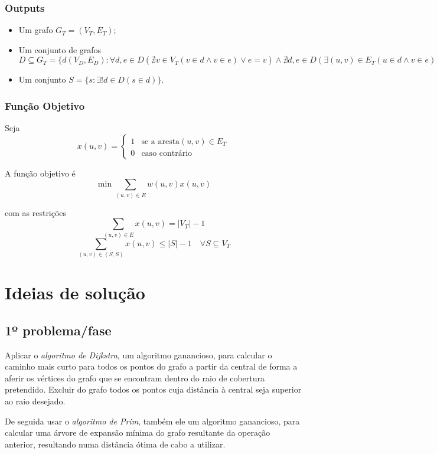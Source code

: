 \documentclass[a4paper,12pt,titlepage]{article}
\begin{document}
\subsubsection*{Outputs}
\begin{itemize}
\item Um grafo $G_T = ( V_T,E_T )$;
\item Um conjunto de grafos $D \subseteq G_T = \{d(V_D,E_D): \forall d,e \in D(\nexists v \in V_T(v \in d \land v \in e) \lor e=v) \land \nexists d,e\in D(\exists(u,v) \in E_T(u \in d \land v \in e)) \land d\neq e \}$
\item Um conjunto $S = \{s : \exists! d \in D(s \in d)\}$.
\end{itemize}

\subsubsection*{Função Objetivo}
Seja $$x(u,v) = \begin{cases}
1 & \text{se a aresta} (u,v) \in E_T\\
0 & \text{caso contrário} 
\end{cases}$$

A função objetivo é\cite{ieor_mst}
$$\min \sum_{(u,v)\in E} w(u,v)x(u,v)$$

com as restrições 
$$\sum_{(u,v)\in E} x(u,v) = |V_T| - 1$$
$$\sum_{(u,v)\in (S,S)} x(u,v) \leq |S| - 1 \quad \forall S \subseteq V_T$$
\linebreak
\linebreak
\linebreak
\linebreak
\section{Ideias de solução}
\subsection{1º problema/fase}
Aplicar o \emph{algoritmo de Dijkstra}, um algoritmo ganancioso, para calcular o caminho mais curto para todos os pontos do grafo a partir da central de forma a aferir os vértices do grafo que se encontram dentro do raio de cobertura pretendido. Excluir do grafo todos os pontos cuja distância à central seja superior ao raio desejado.

De seguida usar o \emph{algoritmo de Prim}, também ele um algoritmo ganancioso, para calcular uma árvore de expansão mínima do grafo resultante da operação anterior, resultando numa distância ótima de cabo a utilizar.
\end{document}
